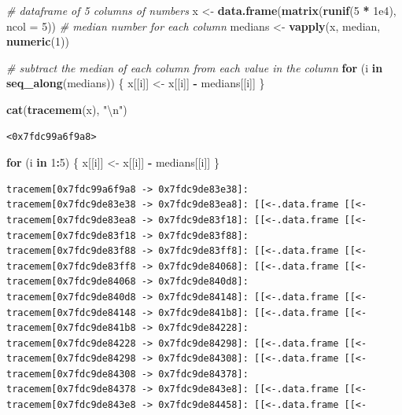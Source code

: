 \documentclass[]{book}
\newenvironment{Shaded}{\begin{snugshade}}{\end{snugshade}}
\newcommand{\CharTok}[1]{\textcolor[rgb]{0.31,0.60,0.02}{#1}}
\newcommand{\CommentTok}[1]{\textcolor[rgb]{0.56,0.35,0.01}{\textit{#1}}}
\newcommand{\ControlFlowTok}[1]{\textcolor[rgb]{0.13,0.29,0.53}{\textbf{#1}}}
\newcommand{\DataTypeTok}[1]{\textcolor[rgb]{0.13,0.29,0.53}{#1}}
\newcommand{\DecValTok}[1]{\textcolor[rgb]{0.00,0.00,0.81}{#1}}
\newcommand{\FloatTok}[1]{\textcolor[rgb]{0.00,0.00,0.81}{#1}}
\newcommand{\KeywordTok}[1]{\textcolor[rgb]{0.13,0.29,0.53}{\textbf{#1}}}
\newcommand{\NormalTok}[1]{#1}
\newcommand{\OperatorTok}[1]{\textcolor[rgb]{0.81,0.36,0.00}{\textbf{#1}}}
\newcommand{\StringTok}[1]{\textcolor[rgb]{0.31,0.60,0.02}{#1}}
\begin{document}
\begin{Shaded}
\begin{Highlighting}[]
\CommentTok{# dataframe of 5 columns of numbers}
\NormalTok{x <-}\StringTok{ }\KeywordTok{data.frame}\NormalTok{(}\KeywordTok{matrix}\NormalTok{(}\KeywordTok{runif}\NormalTok{(}\DecValTok{5} \OperatorTok{*}\StringTok{ }\FloatTok{1e4}\NormalTok{), }\DataTypeTok{ncol =} \DecValTok{5}\NormalTok{))}
\CommentTok{# median number for each column}
\NormalTok{medians <-}\StringTok{ }\KeywordTok{vapply}\NormalTok{(x, median, }\KeywordTok{numeric}\NormalTok{(}\DecValTok{1}\NormalTok{))}

\CommentTok{# subtract the median of each column from each value in the column}
\ControlFlowTok{for}\NormalTok{ (i }\ControlFlowTok{in} \KeywordTok{seq_along}\NormalTok{(medians)) \{}
\NormalTok{  x[[i]] <-}\StringTok{ }\NormalTok{x[[i]] }\OperatorTok{-}\StringTok{ }\NormalTok{medians[[i]]}
\NormalTok{\}}
\end{Highlighting}
\end{Shaded}

\begin{Shaded}
\begin{Highlighting}[]
\KeywordTok{cat}\NormalTok{(}\KeywordTok{tracemem}\NormalTok{(x), }\StringTok{"}\CharTok{\textbackslash{}n}\StringTok{"}\NormalTok{)}
\end{Highlighting}
\end{Shaded}

\begin{verbatim}
<0x7fdc99a6f9a8> 
\end{verbatim}

\begin{Shaded}
\begin{Highlighting}[]
\ControlFlowTok{for}\NormalTok{ (i }\ControlFlowTok{in} \DecValTok{1}\OperatorTok{:}\DecValTok{5}\NormalTok{) \{}
\NormalTok{  x[[i]] <-}\StringTok{ }\NormalTok{x[[i]] }\OperatorTok{-}\StringTok{ }\NormalTok{medians[[i]]}
\NormalTok{\}}
\end{Highlighting}
\end{Shaded}

\begin{verbatim}
tracemem[0x7fdc99a6f9a8 -> 0x7fdc9de83e38]: 
tracemem[0x7fdc9de83e38 -> 0x7fdc9de83ea8]: [[<-.data.frame [[<- 
tracemem[0x7fdc9de83ea8 -> 0x7fdc9de83f18]: [[<-.data.frame [[<- 
tracemem[0x7fdc9de83f18 -> 0x7fdc9de83f88]: 
tracemem[0x7fdc9de83f88 -> 0x7fdc9de83ff8]: [[<-.data.frame [[<- 
tracemem[0x7fdc9de83ff8 -> 0x7fdc9de84068]: [[<-.data.frame [[<- 
tracemem[0x7fdc9de84068 -> 0x7fdc9de840d8]: 
tracemem[0x7fdc9de840d8 -> 0x7fdc9de84148]: [[<-.data.frame [[<- 
tracemem[0x7fdc9de84148 -> 0x7fdc9de841b8]: [[<-.data.frame [[<- 
tracemem[0x7fdc9de841b8 -> 0x7fdc9de84228]: 
tracemem[0x7fdc9de84228 -> 0x7fdc9de84298]: [[<-.data.frame [[<- 
tracemem[0x7fdc9de84298 -> 0x7fdc9de84308]: [[<-.data.frame [[<- 
tracemem[0x7fdc9de84308 -> 0x7fdc9de84378]: 
tracemem[0x7fdc9de84378 -> 0x7fdc9de843e8]: [[<-.data.frame [[<- 
tracemem[0x7fdc9de843e8 -> 0x7fdc9de84458]: [[<-.data.frame [[<- 
\end{verbatim}
\end{document}
